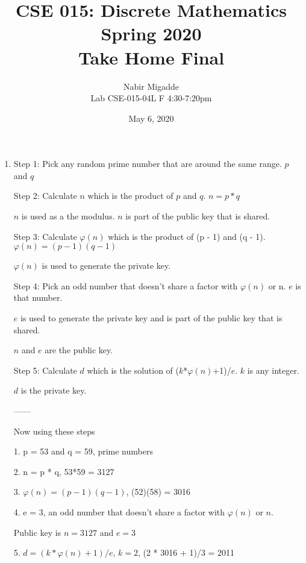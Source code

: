 \documentclass[11pt]{article}
\begin{document}
\author{Nabir Migadde\\
Lab CSE-015-04L F 4:30-7:20pm}

\title{CSE 015: Discrete Mathematics\\
Spring 2020\\
Take Home Final\\}

\date{May 6, 2020}
\maketitle
\begin{enumerate}

\item
Step 1: Pick any random prime number that are around the same range. $p$ and $q$

Step 2: Calculate $n$ which is the product of $p$ and $q$. $n = p * q$

$n$ is used as a the modulus. $n$ is part of the public key that is shared. 

Step 3: Calculate $\varphi (n)$ which is the product of (p - 1) and (q - 1). $\varphi (n) = (p-1)(q-1)$

$\varphi (n)$ is used to generate the private key. 

Step 4: Pick an odd number that doesn't share a factor with $\varphi (n)$ or n. $e$ is that number. 

$e$ is used to generate the private key and is part of the public key that is shared. 

$n$ and $e$ are the public key. 

Step 5: Calculate $d$ which is the solution of ($k$*$\varphi (n)$+1)/$e$. $k$ is any integer. 

$d$ is the private key. 

------

Now using these steps

1. p = 53 and q = 59, prime numbers

2. n = p * q, 53*59 = 3127

3. $\varphi (n) = (p-1)(q-1)$, (52)(58) = 3016

4. e = 3, an odd number that doesn't share a factor with $\varphi (n)$ or $n$.

Public key is $n = 3127$ and $e = 3$

5. $d = (k * \varphi (n) + 1)/e$, $k = 2$, (2 * 3016 + 1)/3 = 2011


\end{enumerate}
\end{document}
